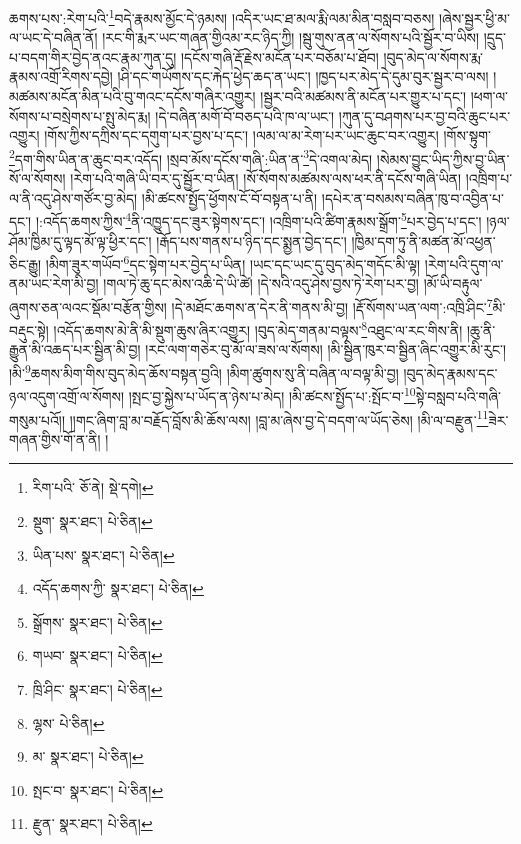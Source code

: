 ཆགས་པས་:རེག་པའི་\footnote{རིག་པའི་  ཅོ་ནེ།  སྡེ་དགེ། }བདེ་རྣམས་མྱོང་དེ་ཉམས། །འདིར་ཡང་ཐ་མལ་རྨི་ལམ་མིན་བསླབ་བཅས། །ཞེས་སྦྱར་ཕྱི་མ་ལ་ཡང་དེ་བཞིན་ནོ། །རང་གི་རྨར་ཡང་གཞན་གྱིའམ་རང་ཉིད་ཀྱི། །སྦུ་གུས་ནན་ལ་སོགས་པའི་སྦྱོར་བ་ཡིས། །དྲུད་པ་བདག་གིར་བྱེད་ནའང་རྣམ་ཀུན་དུ། །དངོས་གཞི་རྡོ་རྗེས་མངོན་པར་བཅོམ་པ་ཐོབ། །བུད་མེད་ལ་སོགས་རྨ་རྣམས་འགྲོ་རིགས་དབྱེ། །ཤི་དང་གཡོགས་དང་རྐེད་ཕྱེད་ཆད་ན་ཡང་། །ཁྱད་པར་མེད་དེ་དུམ་བུར་སྦྱར་བ་ལས། །མཚམས་མངོན་མིན་པའི་བུ་གའང་དངོས་གཞིར་འགྱུར། །སྦྱར་བའི་མཚམས་ནི་མངོན་པར་གྱུར་པ་དང་། །ཕག་ལ་སོགས་པ་བསྲེགས་པ་སྤུ་མེད་རྨ། །དེ་བཞིན་མགོ་བོ་བཅད་པའི་ཁ་ལ་ཡང་། །ཀུན་དུ་བཤགས་པར་བྱ་བའི་ཆུང་པར་འགྱུར། །གོས་ཀྱིས་དཀྲིས་དང་དགུག་པར་བྱས་པ་དང་། །ལམ་ལ་མ་རེག་པར་ཡང་ཆུང་བར་འགྱུར། །གོས་སྟུག་\footnote{སྡུག་  སྣར་ཐང་།  པེ་ཅིན། }དག་གིས་ཡིན་ན་ཆུང་བར་འདོད། །སྲབ་མོས་དངོས་གཞི་:ཡིན་ན་\footnote{ཡིན་པས་  སྣར་ཐང་།  པེ་ཅིན། }དེ་འགལ་མེད། །སེམས་བྱུང་ཡིད་ཀྱིས་བྱ་ཡིན་སོ་ལ་སོགས། །རེག་པའི་གཞི་ཡི་བར་དུ་སྦྱོར་བ་ཡིན། །སོ་སོགས་མཚམས་ལས་ཕར་ནི་དངོས་གཞི་ཡིན། །འཁྲིག་པ་ལ་ནི་འདུ་ཤེས་གཙོར་བྱ་མེད། །མི་ཚངས་སྤྱོད་ཕྱོགས་ངོ་བོ་བསྟན་པ་ནི། །དཔེར་ན་བསམས་བཞིན་ཁུ་བ་འབྱིན་པ་དང་། །:འདོད་ཆགས་ཀྱིས་\footnote{འདོད་ཆགས་ཀྱི་  སྣར་ཐང་།  པེ་ཅིན། }ནི་འཁྱུད་དང་ཟུར་སྟེགས་དང་། །འཁྲིག་པའི་ཚིག་རྣམས་སྒྲོག་\footnote{སྒྲོགས་  སྣར་ཐང་།  པེ་ཅིན། }པར་བྱེད་པ་དང་། །ཉལ་ཤོམ་ཁྱིམ་དུ་ལྟད་མོ་ལྟ་ཕྱིར་དང་། །རྒོད་པས་གནས་པ་ཉིད་དང་སྨྱན་བྱེད་དང་། །ཁྱིམ་དག་ཏུ་ནི་མཚན་མོ་འཕྱན་ཅིང་རྒྱུ། །མིག་ཟུར་གཡོབ་\footnote{གཡབ་  སྣར་ཐང་།  པེ་ཅིན། }དང་སྟེག་པར་བྱེད་པ་ཡིན། །ཡང་དང་ཡང་དུ་བུད་མེད་གདོང་མི་ལྟ། །རེག་པའི་དུག་ལ་ནམ་ཡང་རེག་མི་བྱ། །གལ་ཏེ་ཆུ་དང་མེས་འཆི་དེ་ཡི་ཚེ། །དེ་སའི་འདུ་ཤེས་བྱས་ཏེ་རེག་པར་བྱ། །མོ་ཡི་བརྟུལ་ཞུགས་ཅན་ལའང་སྡོམ་བརྩོན་གྱིས། །དེ་མཐོང་ཆགས་ན་དེར་ནི་གནས་མི་བྱ། །རྡོ་སོགས་ཡན་ལག་:འཁྲི་ཤིང་\footnote{ཁྲི་ཤིང་  སྣར་ཐང་།  པེ་ཅིན། }མི་བརྡུང་སྟེ། །འདོད་ཆགས་མེ་ནི་མི་སྡུག་ཆུས་ཞིར་འགྱུར། །བུད་མེད་གནམ་བལྟས་\footnote{ལྷས་  པེ་ཅིན། }འཐུང་ལ་རང་གིས་ནི། །ཆུ་ནི་རྒྱུན་མི་འཆད་པར་སྦྱིན་མི་བྱ། །རང་ལག་གཅེར་བུ་མོ་ལ་ཟས་ལ་སོགས། །མི་སྦྱིན་ཁུར་བ་སྦྱིན་ཞིང་འགྱུར་མི་རུང་། །མི་\footnote{མ་  སྣར་ཐང་།  པེ་ཅིན། }ཆགས་མིག་གིས་བུད་མེད་ཆོས་བསྟན་བྱའི། །མིག་ཚུགས་སུ་ནི་བཞིན་ལ་བལྟ་མི་བྱ། །བུད་མེད་རྣམས་དང་ཉལ་འདུག་འགྲོ་ལ་སོགས། །སྤང་བྱ་སྐྱེས་པ་ཡོད་ན་ཉེས་པ་མེད། །མི་ཚངས་སྤྱོད་པ་:སྤོང་བ་\footnote{སྤང་བ་  སྣར་ཐང་།  པེ་ཅིན། }སྟེ་བསླབ་པའི་གཞི་གསུམ་པའོ།། །།གང་ཞིག་བླ་མ་བརྗོད་བློས་མི་ཆོས་ལས། །བླ་མ་ཞེས་བྱ་དེ་བདག་ལ་ཡོད་ཅེས། །མི་ལ་བརྫུན་\footnote{རྫུན་  སྣར་ཐང་།  པེ་ཅིན། }ཟེར་གཞན་གྱིས་གོ་ན་ནི། །
